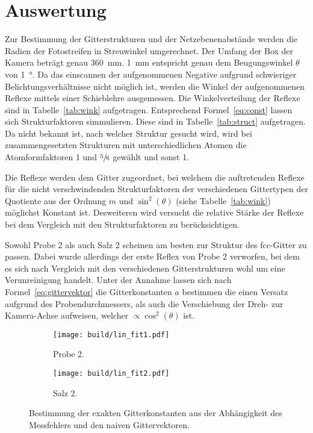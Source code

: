 \section{Auswertung}\label{sec:Auswertung}

Zur Bestimmung der Gitterstrukturen und der Netzebenenabstände werden die
Radien der Fotostreifen in Streuwinkel umgerechnet.
Der Umfang der Box der Kamera beträgt genau \SI{360}{\milli\meter}.
\SI{1}{\milli\meter} entspricht genau dem Beugungswinkel $\theta$ von
\SI{1}{\degree}.
Da das einscannen der aufgenommenen Negative aufgrund schwieriger
Belichtungsverhältnisse nicht möglich ist, werden die Winkel der aufgenommenen
Reflexe mittels einer Schieblehre ausgemessen.
Die Winkelverteilung der Reflexe sind in Tabelle~\ref{tab:wink} aufgetragen.
Entsprechend Formel~\eqref{eq:const} lassen sich Strukturfaktoren simmulieren.
Diese sind in Tabelle~\ref{tab:struct} aufgetragen.
Da nicht bekannt ist, nach welcher Struktur gesucht wird, wird bei
zusammengesetzten Strukturen mit unterschiedlichen Atomen die Atomformfaktoren
1 und $\sfrac{5}{6}$ gewählt und sonst 1.

Die Reflexe werden dem Gitter zugeordnet, bei welchem die auftretenden Reflexe für
die nicht verschwindenden Strukturfaktoren der verschiedenen Gittertypen der
Quotiente aus der Ordnung $m$ und $\sin^2(\theta)$ (siehe Tabelle~\ref{tab:wink})
möglichst Konstant ist.
Desweiteren wird versucht die relative Stärke der Reflexe bei dem Vergleich mit den
Strukturfaktoren zu berücksichtigen.

Sowohl Probe 2 als auch Salz 2 scheinen am besten zur Struktur des fcc-Gitter zu
passen.
Dabei wurde allerdings der erste Reflex von Probe 2 verworfen, bei dem es sich
nach Vergleich mit den verschiedenen Gitterstrukturen wohl um eine Verunreinigung
handelt.
Unter der Annahme lassen sich nach Formel~\eqref{eq:gittervektor} die
Gitterkonstanten $a$ bestimmen die einen Versatz aufgrund des
Probendurchmessers, als auch die Verschiebung der Dreh- zur Kamera-Achse
aufweisen, welcher $\propto \cos^2(\theta)$ ist.
\begin{figure}[ht]
		\centering
		\begin{subfigure}{0.49\textwidth}
				\centering
				\texttt{[image: build/lin\_fit1.pdf]}
				\caption{Probe 2.}
				\label{fig:prb1}
		\end{subfigure}
		\begin{subfigure}{0.49\textwidth}
				\centering
				\texttt{[image: build/lin\_fit2.pdf]}
				\caption{Salz 2.}
				\label{fig:prb1}
		\end{subfigure}
		\caption{Bestimmung der exakten Gitterkonstanten aus der Abhängigkeit
		des	Messfehlers und den naiven Gittervektoren.}
\end{figure}

